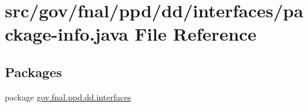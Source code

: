 \hypertarget{gov_2fnal_2ppd_2dd_2interfaces_2package-info_8java}{\section{src/gov/fnal/ppd/dd/interfaces/package-\/info.java File Reference}
\label{gov_2fnal_2ppd_2dd_2interfaces_2package-info_8java}
}
\subsection*{Packages}
\begin{DoxyCompactItemize}
\item 
package \hyperlink{namespacegov_1_1fnal_1_1ppd_1_1dd_1_1interfaces}{gov.\-fnal.\-ppd.\-dd.\-interfaces}
\end{DoxyCompactItemize}
